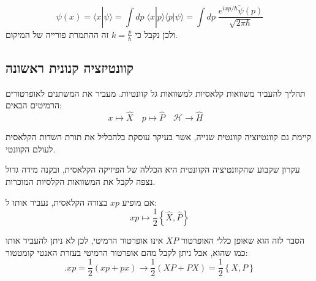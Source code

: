 \documentclass{tstextbook}
\begin{document}
\begin{proposition}
$$\psi(x)=\langle x|\psi\rangle=\int\!\!d p\;\langle x|p\rangle\langle p|\psi\rangle=\int\!\!d p\;{\frac{e^{i x p/\hbar}\tilde{\psi}(p)}{\sqrt{2\pi\hbar}}}$$
ולכן נקבל כי \(k=\frac{p}{\hbar}\) זה ההתמרת פורייה של המיקום.

\end{proposition}
\subsection{קוונטיזציה קנונית ראשונה}

\begin{definition}
תהליך להעביר משוואות קלאסיות למשוואות גל קוונטיות. מעביר את המשתנים לאופרטורים הרמיטים הבאים:
$$x\mapsto \hat{X}\quad p\mapsto \hat{P}\quad \mathcal{H}\to \hat{H}\quad $$

\end{definition}
\begin{remark}
קיימת גם קוונטיזציה קוונטית שנייה, אשר בעיקר עוסקת בלהכליל את תורת השדות הקלאסית לעולם הקוונטי.

\end{remark}
\begin{definition}
עקרון שקבוע שהקוונטיציה הקוונטית היא הכללה של הפיזיקה הקלאסית, ובקנה מידה גדול נצפה לקבל את המשוואות הקלסיות המוכרות.

\end{definition}
\begin{proposition}
אם מופיע \(xp\) בצורה הקלאסית, נעביר אותו ל:
$$xp\mapsto \frac{1}{2}\left\{  \hat{X},\hat{P}  \right\}$$

\end{proposition}
הסבר לזה הוא שאופן כללי האופרטור \(XP\) אינו אופרטור הרמיטי, לכן לא ניתן להעביר אותו כמו שהוא, אבל ניתן לקבל מהם אופרטור הרמיטי בעזרת האנטי קומטטור:
$$.x p={\frac{1}{2}}\left(x p+p x\right)\longrightarrow{\frac{1}{2}}\left(X P+P X\right)={\frac{1}{2}}\left\{X,P\right\}$$
\end{document}

